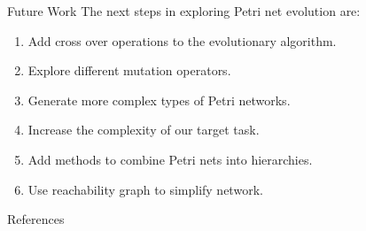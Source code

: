 \documentclass[12pt]{beamer}
\begin{document}
\begin{frame}{Future Work}
The next steps in exploring Petri net evolution are:
\begin{enumerate}
\item Add cross over operations to the evolutionary algorithm.
\item Explore different mutation operators.
\item Generate more complex types of Petri networks.
\item Increase the complexity of our target task.
\item Add methods to combine Petri nets into hierarchies.
\item Use reachability graph to simplify network.
\end{enumerate}

\end{frame}

\begin{frame}{References}


\nocite{PNP}
\nocite{stanley:gecco02a}
\end{frame}
\end{document}
